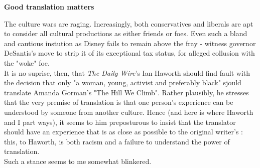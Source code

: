 \documentclass[a4paper,english,bookmarks]{article}
\begin{document}
\textbf{Good translation matters}\medskip

The culture wars are raging. Increasingly, both conservatives and liberals are apt to consider all cultural productions as either friends or foes. Even such a bland and cautious instution as Disney fails to remain above the fray - witness governor DeSantis's move to strip it of its exceptional tax status, for alleged collusion with the "woke" foe.\\

It is no suprise, then, that \textit{The Daily Wire}'s Ian Haworth should find fault with the decision that only "a woman, young, activist and preferably black" sjould translate Amanda Gorman's "The Hill We Climb". Rather plausibly, he stresses that the very premise of translation is that one person's experience can be understood by someone from another culture. Hence (and here is where Haworth and I part ways), it seems to him preposturous to insist that the translator should have an experience that is as close as possible to the original writer's : this, to Haworth, is both racism and a failure to understand the power of translation.\\

Such a stance seems to me somewhat blinkered.
\end{document}
